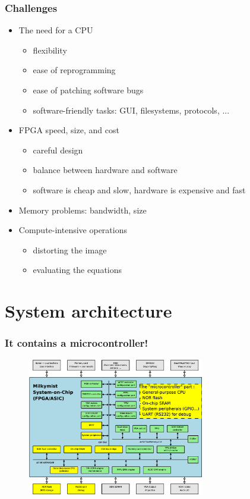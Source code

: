 \documentclass{beamer}
\begin{document}
\frame
{
  \frametitle{Challenges}

  \begin{itemize}
  \item The need for a CPU
  \begin{itemize}
     \item flexibility
     \item ease of reprogramming
     \item ease of patching software bugs
     \item software-friendly tasks: GUI, filesystems, protocols, ...
  \end{itemize}
  \item FPGA speed, size, and cost
  \begin{itemize}
     \item careful design
     \item balance between hardware and software
     \item software is cheap and slow, hardware is expensive and fast
  \end{itemize}
  \item Memory problems: bandwidth, size
  \item Compute-intensive operations
  \begin{itemize}
     \item distorting the image
     \item evaluating the equations
  \end{itemize}
  \end{itemize}
}

\section{System architecture}
\frame
{
  \begin{center}
  \end{center}
}

\frame
{
  \frametitle{It contains a microcontroller!}
  \begin{figure}[H]
  \includegraphics[height=60mm]{microcontroller.eps}
  \end{figure}
}
\end{document}
